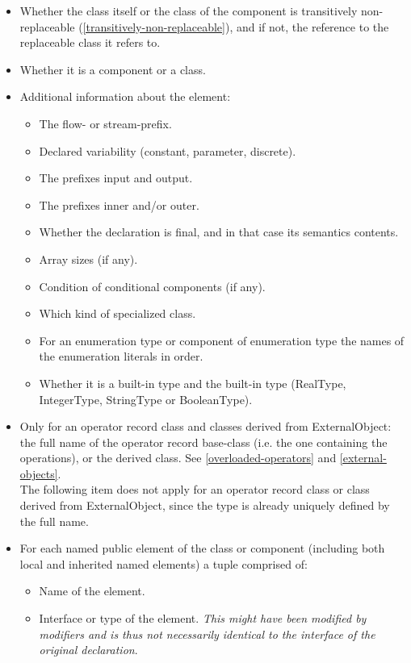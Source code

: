 \documentclass[10pt,a4paper]{report}
\begin{document}
\begin{itemize}
\item
  Whether the class itself or the class of the component is transitively
  non-replaceable (\ref{transitively-non-replaceable}), and if not, the reference to the
  replaceable class it refers to.
\item
  Whether it is a component or a class.
\item
  Additional information about the element:

  \begin{itemize}
  \item
    The flow- or stream-prefix.
  \item
    Declared variability (constant, parameter, discrete).
  \item
    The prefixes input and output.
  \item
    The prefixes inner and/or outer.
  \item
    Whether the declaration is final, and in that case its semantics
    contents.
  \item
    Array sizes (if any).
  \item
    Condition of conditional components (if any).
  \item
    Which kind of specialized class.
  \item
    For an enumeration type or component of enumeration type the names
    of the enumeration literals in order.
  \item
    Whether it is a built-in type and the built-in type (RealType,
    IntegerType, StringType or BooleanType).
  \end{itemize}
\item
  Only for an operator record class and classes derived from
  ExternalObject: the full name of the operator record base-class (i.e.
  the one containing the operations), or the derived class. See 
  \ref{overloaded-operators} and \ref{external-objects}.\\
  The following item does not apply for an operator record class or
  class derived from ExternalObject, since the type is already uniquely
  defined by the full name.
\item
  For each named public element of the class or component (including
  both local and inherited named elements) a tuple comprised of:

  \begin{itemize}
  \item
    Name of the element.
  \item
    Interface or type of the element. \emph{This might have been
    modified by modifiers and is thus not necessarily identical to the
    interface of the original declaration}.
  \end{itemize}
\end{itemize}
\end{document}
